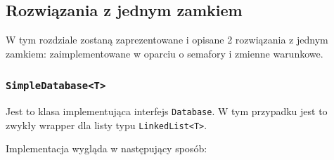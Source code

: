 \documentclass[11pt]{article}
\begin{document}
    \hypertarget{rozwiux105zania-z-jednym-zamkiem}{%
\subsection{Rozwiązania z jednym
zamkiem}\label{rozwiux105zania-z-jednym-zamkiem}}

W tym rozdziale zostaną zaprezentowane i opisane 2 rozwiązania z jednym
zamkiem: zaimplementowane w oparciu o semafory i zmienne warunkowe.

    \hypertarget{simpledatabaset}{%
\subsubsection{\texorpdfstring{\texttt{SimpleDatabase\textless{}T\textgreater{}}}{SimpleDatabase\textless T\textgreater{}}}\label{simpledatabaset}}

Jest to klasa implementująca interfejs \texttt{Database}. W tym
przypadku jest to zwykły wrapper dla listy typu
\texttt{LinkedList\textless{}T\textgreater{}}.

Implementacja wygląda w następujący sposób:
\end{document}
